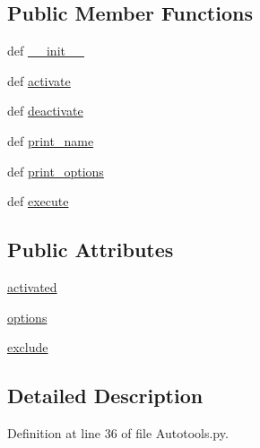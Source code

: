 \subsection*{Public Member Functions}
\begin{DoxyCompactItemize}
\item 
def \hyperlink{class_autotools_1_1_autotools_a5b5ac092ad7f4bc45bf785633c8be95a}{\-\_\-\-\_\-init\-\_\-\-\_\-}
\item 
def \hyperlink{class_autotools_1_1_autotools_a202b0e727db575d20a381cd039dd3597}{activate}
\item 
def \hyperlink{class_autotools_1_1_autotools_a74513a2f4135b506e66c047559f9571e}{deactivate}
\item 
def \hyperlink{class_autotools_1_1_autotools_a0873459245ef2255a5a7386957fa592e}{print\-\_\-name}
\item 
def \hyperlink{class_autotools_1_1_autotools_a41481e9f2a7e7fce32f51cc8feb909fd}{print\-\_\-options}
\item 
def \hyperlink{class_autotools_1_1_autotools_a5ae85e70e9e6252f4be23ef60624f633}{execute}
\end{DoxyCompactItemize}
\subsection*{Public Attributes}
\begin{DoxyCompactItemize}
\item 
\hyperlink{class_autotools_1_1_autotools_a6bbb714a91bc8b6fe749326772b073b3}{activated}
\item 
\hyperlink{class_autotools_1_1_autotools_a8b348e19f0a7104bde9c43c3a6ed695d}{options}
\item 
\hyperlink{class_autotools_1_1_autotools_aee37d9789ea22ee310ebc357cd721b7f}{exclude}
\end{DoxyCompactItemize}


\subsection{Detailed Description}


Definition at line 36 of file Autotools.\-py.



